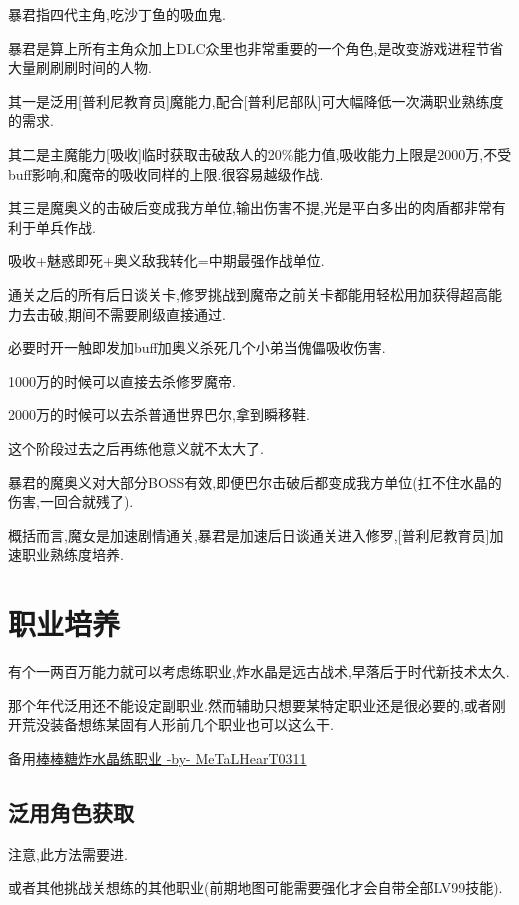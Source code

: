 	暴君指四代主角,吃沙丁鱼的吸血鬼.

	暴君是算上所有主角众加上DLC众里也非常重要的一个角色,是改变游戏进程节省大量刷刷刷时间的人物.

	其一是泛用[普利尼教育员]魔能力,配合[普利尼部队]可大幅降低一次满职业熟练度的需求.

	其二是主魔能力[吸收]临时获取击破敌人的20\%能力值,吸收能力上限是2000万,不受buff影响,和魔帝的吸收同样的上限.很容易越级作战.

	其三是魔奥义的击破后变成我方单位,输出伤害不提,光是平白多出的肉盾都非常有利于单兵作战.

	吸收+魅惑即死+奥义敌我转化=中期最强作战单位.

	通关之后的所有后日谈关卡,修罗挑战到魔帝之前关卡都能用轻松用{\color{red}{即死流}}加{\color{red}{暴君吸收}}获得超高能力去击破,期间不需要刷级直接通过.

	必要时开一触即发加buff加奥义杀死几个小弟当傀儡吸收伤害.

	1000万的时候可以直接去杀修罗魔帝.

	2000万的时候可以去杀普通世界巴尔,拿到瞬移鞋.

	这个阶段过去之后再练他意义就不太大了.

	暴君的魔奥义对大部分BOSS有效,即便巴尔击破后都变成我方单位(扛不住水晶的伤害,一回合就残了).

	概括而言,魔女是加速剧情通关,暴君是加速后日谈通关进入修罗,[普利尼教育员]加速职业熟练度培养.

\newpage

	\section{职业培养}

	有个一两百万能力就可以考虑练职业,炸水晶是远古战术,早落后于时代新技术太久.

	那个年代泛用还不能设定副职业.然而辅助只想要某特定职业还是很必要的,或者刚开荒没装备想练某固有人形前几个职业也可以这么干.

	备用\href{http://tieba.baidu.com/p/3717431968}{棒棒糖炸水晶练职业 -by- MeTaLHearT0311}

		\subsection{泛用角色获取}

		注意,此方法需要进{\color{red}{修罗以后}}.

		{\color{red}{去兔兔魔界挑战关,抓捕贤者}}或者其他挑战关想练的其他职业(前期地图可能需要强化才会自带全部LV99技能).


